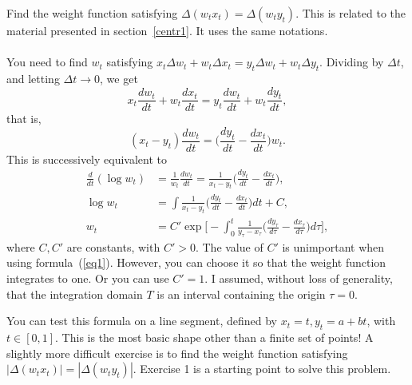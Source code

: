 \documentclass[oneside,10pt]{book}
\begin{document}
\begin{Exercise}Find the weight function satisfying $\Delta(w_t x_t)=\Delta(w_t y_t)$. This is related to the material presented in section~\ref{centr1}. It uses the same notations. \vspace{1ex} \\
 \vspace{1ex} \\
You need to find $w_t$ satisfying $x_t\Delta w_t + w_t\Delta x_t = y_t\Delta w_t + w_t\Delta y_t$. Dividing by $\Delta t$, and letting $\Delta t\rightarrow 0$, we get
$$x_t \frac{dw_t}{dt}+w_t  \frac{dx_t}{dt} = y_t \frac{dw_t}{dt}+w_t  \frac{dy_t}{dt},$$
that is,
$$(x_t - y_t) \frac{dw_t}{dt} = \Big(\frac{dy_t}{dt} - \frac{dx_t}{dt}\Big) w_t.$$
This is successively equivalent to
\begin{align}
\frac{d}{dt}(\log w_t) & = \frac{1}{w_t}\frac{dw_t}{dt}=\frac{1}{x_t - y_t} \Big(\frac{dy_t}{dt} - \frac{dx_t}{dt}\Big), \nonumber \\
\log w_t & = \int \frac{1}{x_t - y_t} \Big(\frac{dy_t}{dt} - \frac{dx_t}{dt}\Big)dt +C,  \nonumber\\
w_t & = C' \exp\Big[-\int_0^t \frac{1}{y_\tau - x_\tau} \Big(\frac{dy_\tau}{d\tau} - \frac{dx_\tau}{d\tau}\Big)d\tau\Big], \nonumber
\end{align}
where $C, C'$ are constants, with $C'>0$. The value of $C'$ is unimportant when using formula~(\ref{eq1}). However, you can choose it so that the weight function integrates to one. Or you can use $C'=1$. I assumed, without loss of generality, that the integration domain $T$ is an interval containing the origin $\tau=0$.  

\noindent You can test this formula on a line segment, defined by $x_t=t, y_t=a+bt$, with $t\in[0, 1]$. This is the most basic shape other than a finite set of points! A slightly more difficult exercise is to find the weight function satisfying $|\Delta(w_t x_t)|=|\Delta(w_t y_t)|$. Exercise 1 is a starting point to solve this problem.
\end{Exercise}
\end{document}
